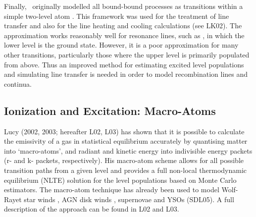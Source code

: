 \documentclass[preprint, a4paper, 11pt]{aastex}
\begin{document}
Finally, \py\ originally modelled all bound-bound processes as transitions
within a simple two-level atom \cite[e.g.][]{mihalas}. 
This framework was used for the treatment of line transfer and also
for the line heating and cooling calculations (see LK02). 
The approximation works reasonably well for resonance  
lines, such as \civfull, in which the lower level is the ground state.  
However, it is a poor approximation for many other
transitions, particularly those where the upper level
is primarily populated from above. Thus an improved method for
estimating excited level populations and simulating line transfer is
needed in order to model recombination lines and continua.

\subsection{Ionization and Excitation: Macro-Atoms}

Lucy (2002, 2003\nocite{lucy2002, lucy2003}; hereafter L02, L03) 
has shown that it is possible to calculate the emissivity of a gas in
statistical equilibrium accurately by quantising matter into
`macro-atoms', and radiant and kinetic energy into indivisible energy
packets (r- and k- packets, respectively). His macro-atom scheme
allows for all possible transition paths from a given level and
provides a full non-local thermodynamic equilibrium (NLTE) solution
for the level populations based on Monte Carlo estimators. The macro-atom
technique has already been used to model Wolf-Rayet star
winds \citep{sim2004}, AGN disk winds \citep{simlong2008, tatum2012},
supernovae \citep{kromersim2009, kerzendorfsim} and YSOs (SDL05). A full 
description of the approach can be found in L02 and L03. 
\end{document}

